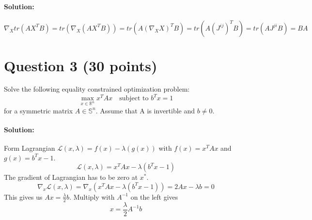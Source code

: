 \documentclass[
	10pt, %
]{../fphw}
\begin{document}
	\paragraph{Solution:} 
	\begin{equation*}
		\nabla_X tr(AX^TB) = tr(\nabla_X (AX^TB)) = tr(A(\nabla_X X)^T B) 
		= tr(A(J^{ij})^TB) = tr(AJ^{ji}B) = BA
	\end{equation*}
	
	\section*{Question 3 (30 points)}
	\begin{problem}
		Solve the following equality constrained optimization problem:
		\begin{equation*}
			\max_{x\in\mathbb{R}^n}x^TAx \quad \text{subject to } b^Tx = 1
		\end{equation*}
		for a symmetric matrix $A\in\mathbb{S}^n$. Assume that A is invertible and $b\ne 0$.
	\end{problem}
	\paragraph{Solution:} Form Lagrangian $\mathcal{L}(x,\lambda) = f(x) - \lambda (g(x))$ with $f(x) = x^TAx$ and $g(x) = b^Tx-1$.
	\begin{equation*}
		\mathcal{L}(x,\lambda) = x^TAx - \lambda(b^Tx-1)
	\end{equation*}
	The gradient of Lagrangian has to be zero at $x^*$.
	\begin{equation*}
		\nabla_x\mathcal{L}(x,\lambda) = \nabla_x(x^TAx-\lambda(b^Tx-1)) = 2Ax - \lambda b = 0
	\end{equation*}
	This gives us $Ax = \frac{\lambda}{2}b$. Multiply with $A^{-1}$ on the left gives
	\begin{equation*}
		x = \frac{\lambda}{2} A^{-1}b
	\end{equation*}
	
\end{document}
